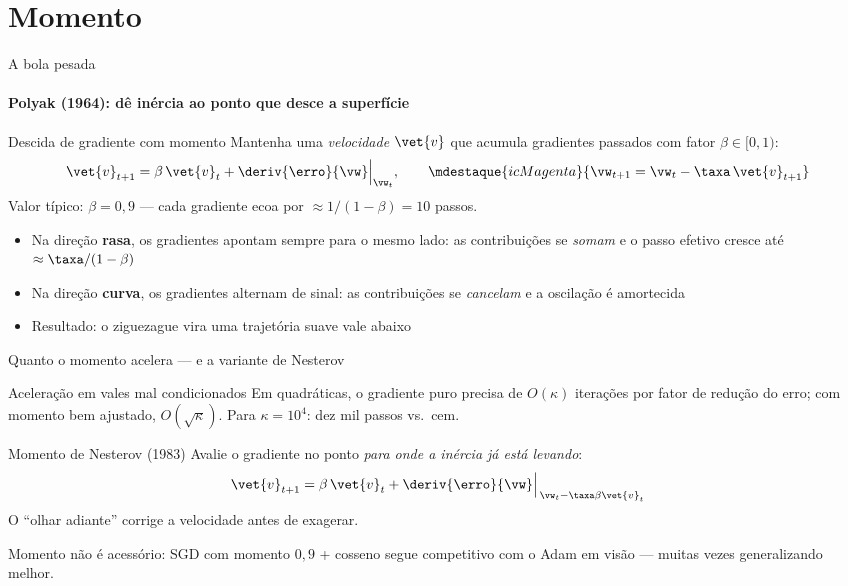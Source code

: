 \documentclass[aspectratio=169, 11pt]{beamer}
\begin{document}
\section{Momento}

\begin{frame}{A bola pesada}
  \framesubtitle{Polyak (1964): dê inércia ao ponto que desce a superfície}

  \begin{defbox}{Descida de gradiente com momento}
    Mantenha uma \emph{velocidade} \(\vet{v}\) que acumula gradientes passados
    com fator \(\beta \in [0,1)\):
    \[
      \vet{v}_{t+1} = \beta\, \vet{v}_t + \deriv{\erro}{\vw}\Bigl|_{\vw_t},
      \qquad
      \mdestaque{icMagenta}{\vw_{t+1} = \vw_t - \taxa\, \vet{v}_{t+1}}
    \]
    Valor típico: \(\beta = 0{,}9\) — cada gradiente ecoa por
    \(\approx 1/(1-\beta) = 10\) passos.
  \end{defbox}

  \begin{itemize}\setlength{\itemsep}{0.3ex}
    \item Na direção \textbf{rasa}, os gradientes apontam sempre para o mesmo
          lado: as contribuições se \emph{somam} e o passo efetivo cresce até
          \(\approx \taxa/(1-\beta)\)
    \item Na direção \textbf{curva}, os gradientes alternam de sinal: as
          contribuições se \emph{cancelam} e a oscilação é amortecida
    \item Resultado: o ziguezague vira uma trajetória suave vale abaixo
  \end{itemize}
\end{frame}

\begin{frame}{Quanto o momento acelera — e a variante de Nesterov}
  \begin{teobox}{Aceleração em vales mal condicionados}
    Em quadráticas, o gradiente puro precisa de \(O(\kappa)\) iterações por
    fator de redução do erro; com momento bem ajustado, \(O(\sqrt{\kappa})\).
    Para \(\kappa = 10^4\): dez mil passos vs.\ cem.
  \end{teobox}

  \begin{defbox}{Momento de Nesterov (1983)}
    Avalie o gradiente no ponto \emph{para onde a inércia já está levando}:
    \[
      \vet{v}_{t+1} = \beta\, \vet{v}_t
        + \deriv{\erro}{\vw}\Bigl|_{\,\vw_t - \taxa\beta \vet{v}_t}
    \]
    O ``olhar adiante'' corrige a velocidade antes de exagerar.
  \end{defbox}

  \smallskip
  Momento \alert{não} é acessório: SGD com momento \(0{,}9\) + cosseno segue
  competitivo com o Adam em visão — muitas vezes generalizando melhor.
\end{frame}
\end{document}
